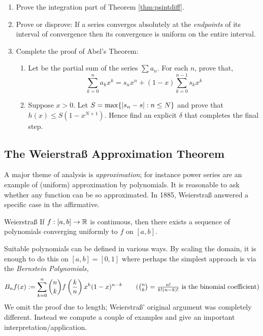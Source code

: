\begin{exercises}
\begin{enumerate}
		\item\label{ex:psintegralproof} Prove the integration part of Theorem \ref{thm:psintdiff}.
		
		\item Prove or disprove: If a series converges absolutely at the \emph{endpoints} of its interval of convergence then its convergence is uniform on the entire interval.
	 
	 	\item Complete the proof of Abel's Theorem:
	 	\begin{enumerate}
	   	\item Let  be the partial sum of the series $\sum a_n$. For each $n$, prove that,
	   	\[\sum_{k=0}^na_kx^k =s_nx^n+(1-x)\sum_{k=0}^{n-1}s_kx^k\]
	   	\item Suppose $x>0$. Let $S=\max\{\left| s_n-s\right|:n\le N\}$ and prove that $h(x)\le S(1-x^{N+1})$. Hence find an explicit $\delta$ that completes the final step.
		\end{enumerate}
		
		
	\end{enumerate}
\end{exercises}


\clearpage



\subsection{The Weierstraß Approximation Theorem}

A major theme of analysis is \emph{approximation}; for instance power series are an example of (uniform) approximation by polynomials. It is reasonable to ask whether any function can be so approximated. In 1885, Weierstraß answered a specific case in the affirmative.


\begin{thm}{Weierstraß}{}
	If $f:[a,b]\to\mathbb{R}$ is continuous, then there exists a sequence of polynomials converging uniformly to $f$ on $[a,b]$.
\end{thm}

Suitable polynomials can be defined in various ways. By scaling the domain, it is enough to do this on $[a,b]=[0,1]$ where perhaps the simplest approach is via the \emph{Bernstein Polynomials,}
\[B_nf(x):=\sum_{k=0}^n \binom nkf\left(\frac kn\right) x^k(1-x)^{n-k} \tag{$\binom nk=\frac{n!}{k!(n-k)!}$ is the binomial coefficient}\]
 We omit the proof due to length; Weierstraß' original argument was completely different. Instead we compute a couple of examples and give an important interpretation/application.


